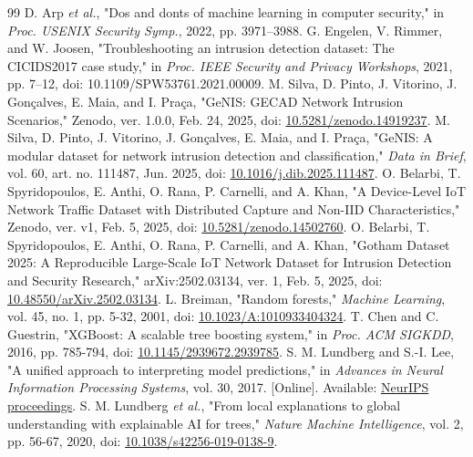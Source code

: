 \documentclass[conference,letterpaper]{IEEEtran}
\begin{document}
\begin{thebibliography}{99}
 D. Arp \emph{et al.}, "Dos and don\textquotesingle ts of machine learning in computer security," in \emph{Proc. USENIX Security Symp.}, 2022, pp. 3971--3988.
 G. Engelen, V. Rimmer, and W. Joosen, "Troubleshooting an intrusion detection dataset: The CICIDS2017 case study," in \emph{Proc. IEEE Security and Privacy Workshops}, 2021, pp. 7--12, doi: 10.1109/SPW53761.2021.00009.
 M. Silva, D. Pinto, J. Vitorino, J. Gonçalves, E. Maia, and I. Praça, "GeNIS: GECAD Network Intrusion Scenarios," Zenodo, ver. 1.0.0, Feb. 24, 2025, doi: \href{https://doi.org/10.5281/zenodo.14919237}{10.5281/zenodo.14919237}.
 M. Silva, D. Pinto, J. Vitorino, J. Gonçalves, E. Maia, and I. Praça, "GeNIS: A modular dataset for network intrusion detection and classification," \emph{Data in Brief}, vol. 60, art. no. 111487, Jun. 2025, doi: \href{https://doi.org/10.1016/j.dib.2025.111487}{10.1016/j.dib.2025.111487}.
 O. Belarbi, T. Spyridopoulos, E. Anthi, O. Rana, P. Carnelli, and A. Khan, "A Device-Level IoT Network Traffic Dataset with Distributed Capture and Non-IID Characteristics," Zenodo, ver. v1, Feb. 5, 2025, doi: \href{https://doi.org/10.5281/zenodo.14502760}{10.5281/zenodo.14502760}.
 O. Belarbi, T. Spyridopoulos, E. Anthi, O. Rana, P. Carnelli, and A. Khan, "Gotham Dataset 2025: A Reproducible Large-Scale IoT Network Dataset for Intrusion Detection and Security Research," arXiv:2502.03134, ver. 1, Feb. 5, 2025, doi: \href{https://doi.org/10.48550/arXiv.2502.03134}{10.48550/arXiv.2502.03134}.
 L. Breiman, "Random forests," \emph{Machine Learning}, vol. 45, no. 1, pp. 5-32, 2001, doi: \href{https://doi.org/10.1023/A:1010933404324}{10.1023/A:1010933404324}.
 T. Chen and C. Guestrin, "XGBoost: A scalable tree boosting system," in \emph{Proc. ACM SIGKDD}, 2016, pp. 785-794, doi: \href{https://doi.org/10.1145/2939672.2939785}{10.1145/2939672.2939785}.
 S. M. Lundberg and S.-I. Lee, "A unified approach to interpreting model predictions," in \emph{Advances in Neural Information Processing Systems}, vol. 30, 2017. [Online]. Available: \href{https://proceedings.neurips.cc/paper/2017/hash/8a20a8621978632d76c43dfd28b67767-Abstract.html}{NeurIPS proceedings}.
 S. M. Lundberg \emph{et al.}, "From local explanations to global understanding with explainable AI for trees," \emph{Nature Machine Intelligence}, vol. 2, pp. 56-67, 2020, doi: \href{https://doi.org/10.1038/s42256-019-0138-9}{10.1038/s42256-019-0138-9}.

\end{thebibliography}
\end{document}
